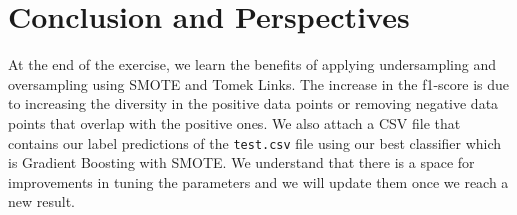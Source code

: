 \documentclass{article}
\begin{document}
\section{Conclusion and Perspectives}
	At the end of the exercise, we learn the benefits of applying undersampling and oversampling using SMOTE and Tomek Links. The increase in the f1-score is due to increasing the diversity in the positive data points or removing negative data points that overlap with the positive ones. We also attach a CSV file that contains our label predictions of the \texttt{test.csv} file using our best classifier which is Gradient Boosting with SMOTE. We understand that there is a space for improvements in tuning the parameters and we will update them once we reach a new result.

\newpage

\end{document}
